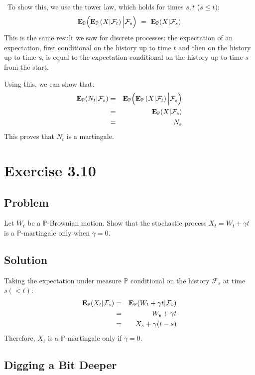 \documentclass[uplatex,a4j,12pt,dvipdfmx]{jsarticle}
\begin{document}
\
To show this, we use the tower law, which holds for times $s,t$ ($s \leq t$):
$$
	{\bf E}_{\mathbb{P}}
	\Big(
	{\bf E}_{\mathbb{P}}
	\left(
	X | \mathcal{F}_{t}
	\right)
	\Big| \mathcal{F}_{s} \Big)
	\ = \
	{\bf E}_{\mathbb{P}}( X | \mathcal{F}_{s} )
$$
This is the same result we saw for discrete processes: the expectation of an expectation, first conditional on the history up to time $t$ and then on the history up to time $s$, is equal to the expectation conditional on the history up to time $s$ from the start.

Using this, we can show that:
%
\begin{eqnarray*}
	{\bf E}_{\mathbb{P}}( N_{t} | \mathcal{F}_{s} )
	&=&
	{\bf E}_{\mathbb{P}}
	\Big(
	{\bf E}_{\mathbb{P}}
	\left(
	X | \mathcal{F}_{t}
	\right)
	\Big| \mathcal{F}_{s} \Big)
	\\ &=&
	{\bf E}_{\mathbb{P}}( X | \mathcal{F}_{s} )
	\\ &=&
	N_{s}
\end{eqnarray*}
%
This proves that $N_{t}$ is a martingale.

\section{Exercise 3.10}

\subsection{Problem}

Let $W_{t}$ be a $\mathbb{P}$-Brownian motion. Show that the stochastic process $X_{t}=W_{t} + \gamma t$ is a $\mathbb{P}$-martingale only when $\gamma=0$.

\subsection{Solution}

Taking the expectation under measure $\mathbb{P}$ conditional on the history $\mathcal{F}_{s}$ at time $s(<t)$:
%
\begin{eqnarray*}
	{\bf E}_{\mathbb{P}}( X_{t} | \mathcal{F}_{s} )
	&=&
	{\bf E}_{\mathbb{P}}( W_{t} + \gamma t | \mathcal{F}_{s} )
	\\ &=&
	W_{s}+ \gamma t
	\\ &=&
	X_{s} + \gamma ( t - s )
\end{eqnarray*}
%
Therefore, $X_{t}$ is a $\mathbb{P}$-martingale only if $\gamma = 0$.
\subsection{Digging a Bit Deeper}
\end{document}
